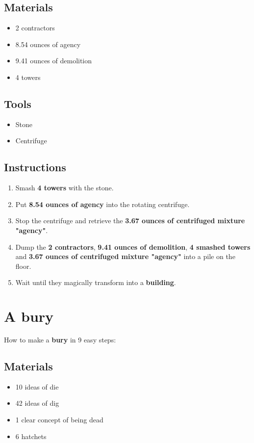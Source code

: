 \documentclass{article}
\begin{document}
\subsection{Materials}\begin{itemize}
\item 
2 contractors
\item 
8.54 ounces of agency
\item 
9.41 ounces of demolition
\item 
4 towers
\end{itemize}
\subsection{Tools}\begin{itemize}
\item 
Stone
\item 
Centrifuge
\end{itemize}
\subsection{Instructions}\begin{enumerate}
\item 
Smash \textbf{4 towers} with the stone.
\item 
Put \textbf{8.54 ounces of agency} into the rotating centrifuge.
\item 
Stop the centrifuge and retrieve the \textbf{3.67 ounces of centrifuged mixture "agency"}.
\item 
Dump the \textbf{2 contractors}, \textbf{9.41 ounces of demolition}, \textbf{4 smashed towers} and \textbf{3.67 ounces of centrifuged mixture "agency"} into a pile on the floor.
\item 
Wait until they magically transform into a \textbf{building}.
\end{enumerate}
\newpage
\section{A bury}How to make a \textbf{bury} in 9 easy steps:

\subsection{Materials}\begin{itemize}
\item 
10 ideas of die
\item 
42 ideas of dig
\item 
1 clear concept of being dead
\item 
6 hatchets
\end{itemize}
\end{document}
